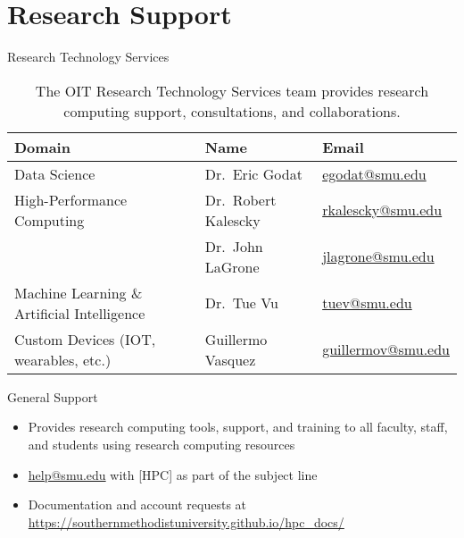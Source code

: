 \section{Research Support}

\begin{frame}{Research Technology Services}
\begin{table}
\small
\begin{tabularx}{\textwidth}{Xll}
\toprule
Domain & Name & Email \\
\midrule
Data Science & Dr.\ Eric Godat & \href{mailto:egodat@smu.edu}{egodat@smu.edu} \\
High-Performance Computing & Dr.\ Robert Kalescky & \href{mailto:rkalescky@smu.edu}{rkalescky@smu.edu} \\
& Dr.\ John LaGrone & \href{mailto:jlagrone@smu.edu}{jlagrone@smu.edu} \\
Machine Learning \& Artificial Intelligence & Dr.\ Tue Vu & \href{mailto:tuev@smu.edu}{tuev@smu.edu} \\
Custom Devices (IOT, wearables, etc.) & Guillermo Vasquez & \href{mailto:guillermov@smu.edu}{guillermov@smu.edu} \\
\bottomrule
\end{tabularx}
\caption{The OIT Research Technology Services team provides research computing support, consultations, and collaborations.}
\end{table}
\end{frame}

\begin{frame}{General Support}
\begin{itemize}
  \item Provides research computing tools, support, and training to all faculty, staff, and students using research computing resources
  \item \href{mailto:help@smu.edu}{help@smu.edu} with [HPC] as part of the subject line
  \item Documentation and account requests at \url{https://southernmethodistuniversity.github.io/hpc_docs/}
\end{itemize}
\end{frame}


